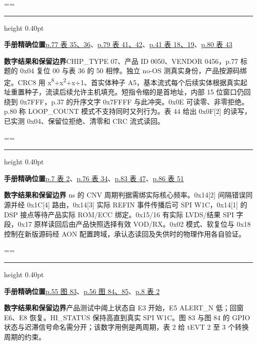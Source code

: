 \documentclass[UTF8,fontset=none,zihao=-4,a4paper]{ctexart}
\newcommand{\TraceItem}[1]{%
  \par{\color{TraceRule}\hrule height 0.40pt}\nobreak\smallskip%
  \noindent{\bfseries\color{TraceTitle}#1\par}\nopagebreak[4]}
\newcommand{\TraceField}[2]{%
  \par\noindent\textbf{\textcolor{TraceAccent}{#1}}\enspace#2\par}
\newenvironment{TraceCard}
  {\par\addvspace{4pt}\setbox\TraceCardBox=\vbox\bgroup\hsize=\linewidth}
  {\par\egroup
   \ifdim\dimexpr\ht\TraceCardBox+\dp\TraceCardBox\relax<0.30\textheight
     \box\TraceCardBox
   \else
     \unvbox\TraceCardBox
   \fi}
\begin{document}
\begin{TraceCard}
\TraceItem{配置身份和 CRC8}
\TraceField{手册精确位置}{\href{https://www.analog.com/media/en/technical-documentation/data-sheets/ad4080.pdf\#page=77}{p.77 表 35、\allowbreak{}36}、\allowbreak{}\href{https://www.analog.com/media/en/technical-documentation/data-sheets/ad4080.pdf\#page=79}{p.79 表 41、\allowbreak{}42}、\allowbreak{}\href{https://www.analog.com/media/en/technical-documentation/data-sheets/ad4080.pdf\#page=41}{p.41 表 18、\allowbreak{}19}、\allowbreak{}\href{https://www.analog.com/media/en/technical-documentation/data-sheets/ad4080.pdf\#page=80}{p.80 表 43}}
\TraceField{数字结果和保留边界}{CHIP\_\relax{}TYPE 07、\allowbreak{}产品 ID 0050、\allowbreak{}VENDOR 0456，p.77 标题的 0x04 复位 00 与表 36 的 50 相悖。独立 no-OS 测真实身份，产品按源码绑定。CRC8 用 x\textsuperscript{8}+x\textsuperscript{2}+x+1、\allowbreak{}首实体种子 A5，基本流式每个后续实体根据真实起址重置种子，流读后续允许主机填充。短指令缩的是首地址，内部 15 位窗口仍回绕到 0x7FFF，p.37 的升序文字 0x7FFFF 与此冲突。0x0E 可读零、\allowbreak{}非零拒绝。p.80 称 LOOP\_\penalty150\relax{}COUNT 模式不支持同时又列行为。表 44 给出 0x0F[2] 的读写，已实测 0x04、\allowbreak{}保留位拒绝、\allowbreak{}清零和 CRC 流式读回。}
\end{TraceCard}
\begin{TraceCard}
\TraceItem{CNV 和错误/模式}
\TraceField{手册精确位置}{\href{https://www.analog.com/media/en/technical-documentation/data-sheets/ad4080.pdf\#page=7}{p.7 表 2}、\allowbreak{}\href{https://www.analog.com/media/en/technical-documentation/data-sheets/ad4080.pdf\#page=76}{p.76 表 34}、\allowbreak{}\href{https://www.analog.com/media/en/technical-documentation/data-sheets/ad4080.pdf\#page=83}{p.83 表 47}、\allowbreak{}\href{https://www.analog.com/media/en/technical-documentation/data-sheets/ad4080.pdf\#page=86}{p.86 表 51}}
\TraceField{数字结果和保留边界}{25 ns 的 CNV 周期判据需绑实际核心频率。0x14[2] 间隔错误同源并经 0x1C[4] 路由，0x14[3] 实际 REFIN 事件传播后可 SPI W1C，0x14[1] 的 DSP 接点等待产品实际 ROM/ECC 绑定。0x15/16 有实际 LVDS/结果 SPI 字段，0x17 原样读回后由产品快照选择有效 VOD/RX。0x02 模式、\allowbreak{}软复位与 0x18 控制在新版源码经 AON 配置跨域，承认态读回及失供时的物理作用各自验证。}
\end{TraceCard}
\begin{TraceCard}
\TraceItem{真正的图 83 触发观测}
\TraceField{手册精确位置}{\href{https://www.analog.com/media/en/technical-documentation/data-sheets/ad4080.pdf\#page=55}{p.55 图 83}、\allowbreak{}\href{https://www.analog.com/media/en/technical-documentation/data-sheets/ad4080.pdf\#page=56}{p.56 图 84、\allowbreak{}85}、\allowbreak{}\href{https://www.analog.com/media/en/technical-documentation/data-sheets/ad4080.pdf\#page=8}{p.8 表 2}}
\TraceField{数字结果和保留边界}{产品测试中阈上状态自 E3 开始，E5 ALERT\_N 低；回窗 E6、\allowbreak{}E8 恢复。HI\_\penalty150\relax{}STATUS 保持高直到真实 SPI W1C。图 83 与图 84 的 GPIO 状态与迟滞信号命名需分开；该数字用例是两周期，表 2 给 tEVT 2 至 3 个转换周期的约束。}
\end{TraceCard}
\end{document}
